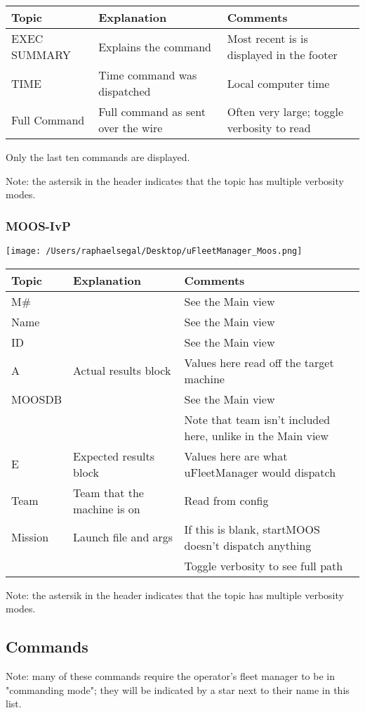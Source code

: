 \documentclass[11pt]{article}
\begin{document}
\begin{tabular}{l|ll}
Topic & Explanation & Comments\\
\hline
EXEC SUMMARY & Explains the command & Most recent is is displayed in the footer\\
TIME & Time command was dispatched & Local computer time\\
Full Command & Full command as sent over the wire & Often very large; toggle verbosity to read
\end{tabular}

Only the last ten commands are displayed. 

Note: the astersik in the header indicates that the topic has multiple verbosity modes.
\subsubsection{MOOS-IvP}
\texttt{[image: /Users/raphaelsegal/Desktop/uFleetManager\_Moos.png]}

\begin{tabular}{l|ll}
Topic & Explanation & Comments\\
\hline
M\# && See the Main view\\
Name && See the Main view\\
ID && See the Main view\\
A & Actual results block & Values here read off the target machine\\
MOOSDB && See the Main view\\&&Note that team isn't included here, unlike in the Main view\\
E & Expected results block & Values here are what uFleetManager would dispatch\\
Team & Team that the machine is on & Read from config\\
Mission & Launch file and args & If this is blank, startMOOS doesn't dispatch anything\\ && Toggle verbosity to see full path\\
\end{tabular}

Note: the astersik in the header indicates that the topic has multiple verbosity modes.

\subsection{Commands}
Note: many of these commands require the operator's fleet manager to be in "commanding mode"; they will be indicated by a star next to their name in this list.
\end{document}
